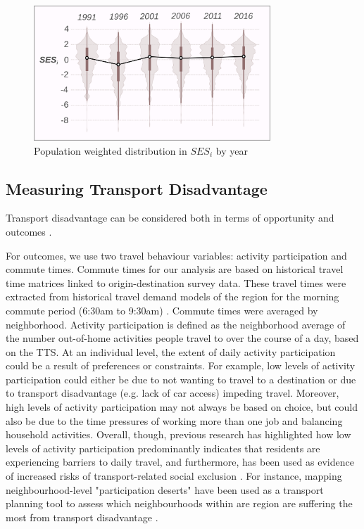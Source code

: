\begin{figure}[H]
	\centering
	
	\includegraphics[width=3.5in]{figures/Fig1}
	\caption{{Population weighted distribution in $SES_i$ by year}}
	\label{fig:SES_violin}
	
\end{figure}




\subsection{Measuring Transport Disadvantage}

Transport disadvantage can be considered both in terms of opportunity and outcomes \cite{banister_inequality_2018}. 

For outcomes, we use two travel behaviour variables: activity participation and commute times. Commute times for our analysis are based on historical travel time matrices linked to origin-destination survey data. These travel times were extracted from historical travel demand models of the region for the morning commute period (6:30am to 9:30am) \cite{tmg_gtamodel_2016}. Commute times were averaged by neighborhood. Activity participation is defined as the neighborhood average of the number out-of-home activities people travel to over the course of a day, based on the TTS. At an individual level, the extent of daily activity participation could be a result of preferences or constraints. For example, low levels of activity participation could either be due to not wanting to travel to a destination or due to transport disadvantage (e.g. lack of car access) impeding travel. Moreover, high levels of activity participation may not always be based on choice, but could also be due to the time pressures of working more than one job and balancing household activities. Overall, though, previous research has highlighted how low levels of activity participation predominantly indicates that residents are experiencing barriers to daily travel, and furthermore, has been used as evidence of increased risks of transport-related social exclusion \cite{martens_transport_2016,lucas_is_2018}. For instance, mapping neighbourhood-level "participation deserts" have been used as a transport planning tool to assess which neighbourhoods within are region are suffering the most from transport disadvantage \cite{allen_planning_2020}.  

